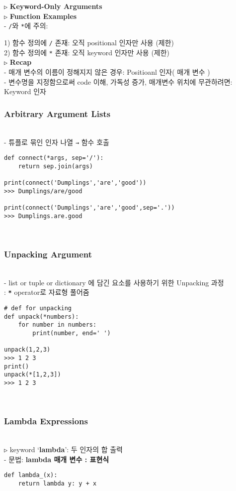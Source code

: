 \documentclass[11pt,a4paper]{article}
\begin{document}
\begin{spacing}{1.5}
\texttt{▷} \large\textbf{Keyword-Only Arguments}\\

\texttt{▷} \large\textbf{Function Examples}\\
- \texttt{/}와 \texttt{*}에 주의:

1) 함수 정의에 \texttt{/} 존재: 오직 positional 인자만 사용 (제한)\\
2) 함수 정의에 \texttt{*} 존재: 오직 keyword 인자만 사용 (제한)\\


\texttt{▷} \large\textbf{Recap}\\
- 매개 변수의 이름이 정해지지 않은 경우: Positioanl 인자( 매개 변수 )\\

- 변수명을 지정함으로써 code 이해, 가독성 증가, 매개변수 위치에 무관하려면: Keyword 인자\\


\subsubsection{\Large\textbf{Arbitrary Argument Lists}}\\
- 튜플로 묶인 인자 나열  \texttt{→}  함수 호출
\begin{lstlisting}[label={list:first}]
def connect(*args, sep='/'):
    return sep.join(args)

print(connect('Dumplings','are','good'))
>>> Dumplings/are/good

print(connect('Dumplings','are','good',sep='.'))
>>> Dumplings.are.good
\end{lstlisting}\\

\subsubsection{\Large\textbf{Unpacking Argument}}\\
- list  or  tuple  or  dictionary  에 담긴 요소를 사용하기 위한 Unpacking 과정\\
:\textbf{ \texttt{*}} operator로 자료형 풀어줌
\begin{lstlisting}[label={list:first}]
# def for unpacking
def unpack(*numbers):
    for number in numbers:
        print(number, end=' ')

unpack(1,2,3)
>>> 1 2 3
print()
unpack(*[1,2,3])
>>> 1 2 3
\end{lstlisting}\\

\subsubsection{\Large\textbf{Lambda Expressions}}\\
\texttt{▷} keyword `\textbf{lambda}': 두 인자의 합 출력\\
- 문법: \textbf{lambda  매개 변수 :  표현식}
\begin{lstlisting}[label={list:first}]
def lambda_(x):
    return lambda y: y + x


\end{lstlisting}
\end{spacing}
\end{document}
